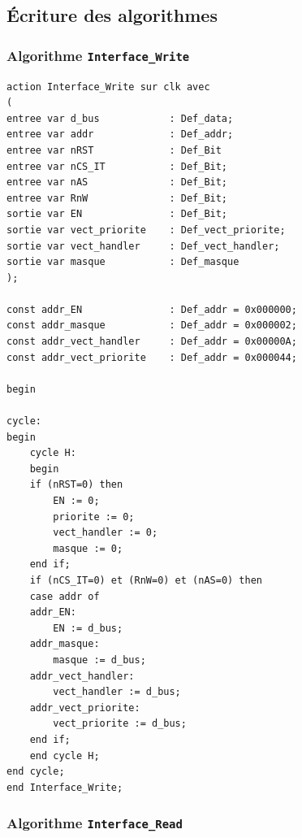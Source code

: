 \newpage

\subsection{Écriture des algorithmes}

\subsubsection{Algorithme \texttt{Interface\_Write}}

\begin{lstlisting}[style=pascalstyle]
action Interface_Write sur clk avec
(
entree var d_bus 			: Def_data;
entree var addr 			: Def_addr;
entree var nRST 			: Def_Bit
entree var nCS_IT 			: Def_Bit;
entree var nAS 				: Def_Bit;
entree var RnW 				: Def_Bit;
sortie var EN 				: Def_Bit;
sortie var vect_priorite 	: Def_vect_priorite;
sortie var vect_handler 	: Def_vect_handler;
sortie var masque 			: Def_masque
);

const addr_EN 				: Def_addr = 0x000000;
const addr_masque 			: Def_addr = 0x000002;
const addr_vect_handler 	: Def_addr = 0x00000A;
const addr_vect_priorite 	: Def_addr = 0x000044;

begin

cycle:
begin
	cycle H:
	begin
	if (nRST=0) then
		EN := 0;
		priorite := 0;
		vect_handler := 0;
		masque := 0;
	end if;
	if (nCS_IT=0) et (RnW=0) et (nAS=0) then
	case addr of
	addr_EN:
		EN := d_bus;
	addr_masque:
		masque := d_bus;
	addr_vect_handler:
		vect_handler := d_bus;
	addr_vect_priorite:
		vect_priorite := d_bus;
	end if;
	end cycle H;
end cycle;
end Interface_Write;
\end{lstlisting}

\newpage
\subsubsection{Algorithme \texttt{Interface\_Read}}

